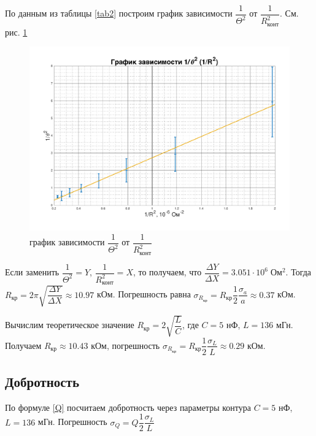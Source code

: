 \documentclass[a4paper,14pt]{article}
\begin{document}
По данным из таблицы \ref{tab2} построим график зависимости $\dfrac{1}{\Theta^2}$ от $\dfrac{1}{R_\text{конт}^2}$. См. рис. \ref{gr2}

\begin{center}
	\begin{figure}[hbt!]
		\centering
		\includegraphics[width=\linewidth]{gr2.pdf}
		\caption{график зависимости $\dfrac{1}{\Theta^2}$ от $\dfrac{1}{R_\text{конт}^2}$}
		\label{gr2}
	\end{figure}
\end{center}

Если заменить $\dfrac{1}{\Theta^2} = Y$, $\dfrac{1}{R_{\text{конт}}^2} = X$, то получаем, что $\dfrac{\Delta Y}{\Delta X} = 3.051 \cdot 10^6 \; \text{О}\text{м}^2$.
Тогда $R_\text{кр} = 2\pi \sqrt{\dfrac{\Delta Y}{\Delta X} } \approx 10.97$ кОм.
Погрешность равна $ \sigma_{R_\text{кр}} = R_\text{кр} \dfrac{1}{2} \dfrac{\sigma_a}{a} \approx 0.37$ кОм. 

Вычислим теоретическое значение $ R_\text{кр}  = 2\sqrt{\dfrac{L}{C}}$, где $ C = 5 $ нФ, $ L = 136 $ мГн. Получаем $ R_\text{кр} \approx 10.43 $ кОм, погрешность $ \sigma_{R_\text{кр}} = R_\text{кр} \dfrac{1}{2} \dfrac{\sigma_L}{L} \approx 0.29 $ кОм. 


\subsection*{Добротность}

По формуле \eqref{Q} посчитаем добротность через параметры контура $ C = 5 $ нФ, $ L = 136 $ мГн. Погрешность $ \sigma_Q = Q \dfrac{1}{2} \dfrac{\sigma_L}{L} $
\end{document}
